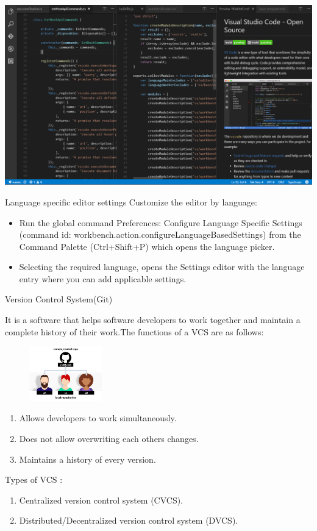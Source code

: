 \documentclass[xcolor=x11names,compress]{beamer}
\renewcommand{\(}{\begin{columns}}
\renewcommand{\)}{\end{columns}}
\newcommand{\<}[1]{\begin{column}{#1}}
\renewcommand{\>}{\end{column}}
\begin{document}
\begin{frame}
\includegraphics[width = \textwidth, height = \textheight]{s2.png}
\end{frame}
\begin{frame}{Language specific editor settings}
Customize the editor by language:
	\begin{itemize}
		\item Run the global command Preferences: Configure Language Specific Settings (command id: workbench.action.configureLanguageBasedSettings) from the Command Palette (Ctrl+Shift+P) which opens the language picker. 
		\item Selecting the required language, opens the Settings editor with the language entry where you can add applicable settings.
	\end{itemize}

	
	
\end{frame}
\begin{frame}{Version Control System(Git)}
	
	It is a software that helps software developers to work together and maintain a complete history of their work.The functions of a VCS are as follows: 
\begin{figure}
		\includegraphics[width=0.28\textwidth]{s13.jpg}
\end{figure}
	\begin{enumerate}
	\item Allows developers to work simultaneously.
	\item Does not allow overwriting each others changes.
	\item Maintains a history of every version.
	\end{enumerate}
	
	Types of VCS : 
	\begin{enumerate}
	\item Centralized version control system (CVCS).
	\item Distributed/Decentralized version control system (DVCS).
	\end{enumerate}
\end{frame}
\end{document}
